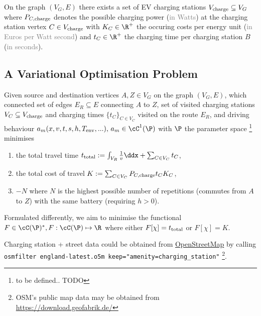 \documentclass[12pt, a4paper]{article}
\begin{document}
  On the graph $(V_G, E)$ there exists a set of EV charging stations $V_{\rm charge} \subseteq V_G$ where $P_{C,\rm charge}$ denotes the possible charging power (\textcolor{gray}{in Watts}) at the charging station vertex $C \in V_{\rm charge}$ with $K_C \in \R^+$ the occuring costs per energy unit (\textcolor{gray}{in Euros per Watt second}) and $t_C \in \R^+$ the charging time per charging station $B$ (\textcolor{gray}{in seconds}).

  \subsection{A Variational Optimisation Problem}
  Given source and destination vertices $A, Z \in V_G$ on the graph $(V_G, E)$, which connected set of edges $E_R \subseteq E$ connecting $A$ to $Z$,
  set of visited charging stations $V_C \subseteq V_{\rm charge}$ and charging times $\{t_C\}_{C \in V_C}$ visited on the route $E_R$, and driving behaviour $a_m(x, v, t, s, h, T_{\rm env}, ...),\, a_m \in \cC^1(\P)$ with $\P$ the parameter space \footnote{to be defined.. TODO} minimises
  \begin{enumerate}
    \item the total travel time $t_{\rm total} := \int_{V_R} \frac{1}{v} \ddx + \sum_{C \in V_C} t_C$,
    \item the total cost of travel $K := \sum_{C \in V_C} P_{C, \rm charge} t_{C} K_C$,
    \item $-N$ where $N$ is the highest possible number of repetitions (commutes from $A$ to $Z$) with the same battery (requiring $h > 0$).
  \end{enumerate}
  Formulated differently, we aim to minimise the functional
  $F \in \cC(\P)^*, F: \cC(\P) \mapsto \R$ where either $F[\chi] = t_{\rm total}$ or $F[\chi] = K$.

  Charging station + street data could be obtained from \href{https://osm.org/}{OpenStreetMap} by calling \\
  \texttt{osmfilter england-latest.o5m \-\-keep="amenity=charging\_station"} \footnote{OSM's public map data may be obtained from \url{https://download.geofabrik.de/}}.

\end{document}
